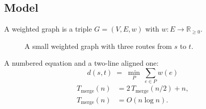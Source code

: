 \subsection{Model}\label{sec:model}
\begin{definition}\label{def:graph}
A weighted graph is a triple $G=(V,E,w)$ with $w:E\to\mathbb{R}_{\ge 0}$.
\end{definition}
\begin{figure}[H]
\centering
{}
\caption{A small weighted graph with three routes from $s$ to $t$.}\label{fig:graph}
\end{figure}
A numbered equation and a two-line aligned one:
\begin{equation}\label{eq:path}
  d(s,t) \;=\; \min_{P}\ \sum_{e\in P} w(e)
\end{equation}
\begin{align}
  T_{\text{merge}}(n) &= 2\,T_{\text{merge}}(n/2) + n, \label{eq:merge}\\
  T_{\text{merge}}(n) &= O(n\log n). \nonumber
\end{align}
